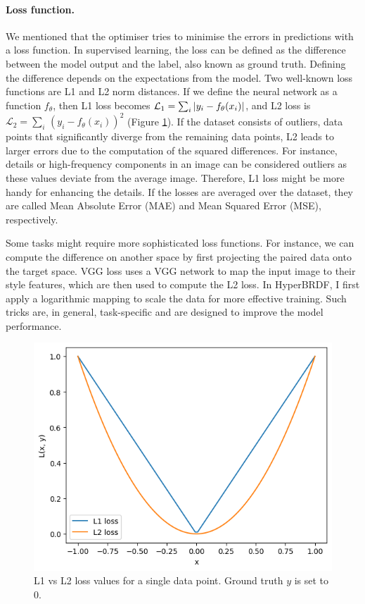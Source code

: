\paragraph{Loss function.} We mentioned that the optimiser tries to minimise the errors in predictions with a loss function. In supervised learning, the loss can be defined as the difference between the model output and the label, also known as ground truth. Defining the difference depends on the expectations from the model. Two well-known loss functions are L1 and L2 norm distances. If we define the neural network as a function $f_\theta$, then L1 loss becomes $\mathcal{L}_{1} = \sum_i \,\lvert y_i - f_\theta(x_i)\rvert$, and L2 loss is $\mathcal{L}_{2} = \sum_i \, (y_i - f_\theta(x_i))^2$ (Figure \ref{fig:l1vsl2loss}).  If the dataset consists of outliers, data points that significantly diverge from the remaining data points, L2 leads to larger errors due to the computation of the squared differences. For instance, details or high-frequency components in an image can be considered outliers as these values deviate from the average image. Therefore, L1 loss might be more handy for enhancing the details. If the losses are averaged over the dataset, they are called Mean Absolute Error (MAE) and Mean Squared Error (MSE), respectively.

Some tasks might require more sophisticated loss functions. For instance, we can compute the difference on another space by first projecting the paired data onto the target space. VGG loss \cite{johnson2016perceptuallossesrealtimestyle} uses a VGG network to map the input image to their style features, which are then used to compute the L2 loss. In HyperBRDF, I first apply a logarithmic mapping to scale the data for more effective training. Such tricks are, in general, task-specific and are designed to improve the model performance.


\begin{figure}[ht]
  \centering
   \includegraphics[width=0.4\linewidth]{Images/l1vsl2loss.png}
   \caption{L1 vs L2 loss values for a single data point. Ground truth $y$ is set to 0.}
   \label{fig:l1vsl2loss}
\end{figure}

